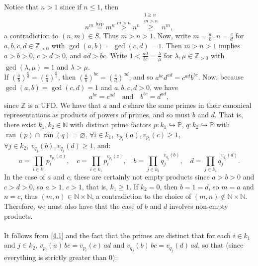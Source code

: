 \documentclass[11pt, a4paper, oneside]{article}
\theoremstyle{remark}
\theoremstyle{lemma}
\begin{document}
\\\\
Notice that $n>1$ since if \( n \leq 1 \), then 
\[
n^m \overset{\text{hyp}}{=} m^n \overset{m > n}{>} n^n \overset{\substack{1 \geq n \\ m > n}}{\geq} n^m,
\]
a contradiction to \( (n, m) \in S \). Thus \( m > n > 1 \). Now, write \( m = \frac{a}{b} \), \( n = \frac{c}{d} \) for \( a, b, c, d \in \mathbb{Z}_{>0} \) with \( \gcd(a, b) = \gcd(c, d) = 1 \). Then \( m > n > 1 \) implies \( a > b > 0 \), \( c > d > 0 \), and \( ad > bc \). Write \( 1 < \frac{ad}{bc} = \frac{\lambda}{\mu} \) for \( \lambda, \mu \in \mathbb{Z}_{>0} \) with \( \gcd(\lambda, \mu) = 1 \) and \( \lambda > \mu \).
\\
If \( \left( \frac{a}{b} \right)^{\frac{c}{d}} = \left( \frac{c}{d} \right)^{\frac{a}{b}} \), then \( \left( \frac{a}{b} \right)^{bc} = \left( \frac{c}{d} \right)^{ad} \), and so \( a^{bc} d^{ad} = c^{ad} b^{bc} \). Now, because \( \gcd(a, b) = \gcd(c, d) = 1 \) and \( a, b, c, d > 0 \), we have
\begin{equation} \label{4.1}
    a^{bc} = c^{ad} \quad \text{and} \quad b^{bc} = d^{ad},
\end{equation}
since \( \mathbb{Z} \) is a UFD. We have that \( a \) and \( c \) share the same primes in their canonical representations as products of powers of primes, and so must \( b \) and \( d \). That is, there exist \( k_1, k_2 \in \mathbb{N} \) with distinct prime factors \( p \colon k_1 \hookrightarrow \mathbb{P} \), \( q \colon k_2 \hookrightarrow \mathbb{P} \)
with \( \operatorname{ran}(p) \cap \operatorname{ran}(q) = \varnothing \), \( \forall i \in k_1,\ v_{p_i}(a), v_{p_i}(c) \geq 1 \), \( \forall j \in k_2,\ v_{q_j}(b), v_{q_j}(d) \geq 1 \), and:
\[
    a = \prod_{i \in k_1} p_i^{v_{p_i}(a)},\quad c = \prod_{i \in k_1} p_i^{v_{p_i}(c)},\quad
    b = \prod_{j \in k_2} q_j^{v_{q_j}(b)},\quad d = \prod_{j \in k_2} q_j^{v_{q_j}(d)}.
\]
In the case of \( a \) and \( c \), these are certainly not empty products since \( a > b > 0 \) and \( c > d > 0 \), so \( a > 1,\, c > 1 \), that is, \( k_1 \geq 1 \). If \( k_2 = 0 \), then \( b = 1 = d \), so \( m = a \) and \( n = c \), thus \( (m, n) \in \mathbb{N} \times \mathbb{N} \), a contradiction to the choice of \( (m, n) \notin \mathbb{N} \times \mathbb{N} \). Therefore, we must also have that the case of \( b \) and \( d \) involves non-empty products.
\\\\
It follows from \eqref{4.1} and the fact that the primes are distinct that for each \( i \in k_1 \) and \( j \in k_2 \), \( v_{p_i}(a)\, bc = v_{p_i}(c)\, ad \) and \( v_{q_j}(b)\, bc = v_{q_j}(d)\, ad \), so that (since everything is strictly greater than \( 0 \)):
\end{document}
